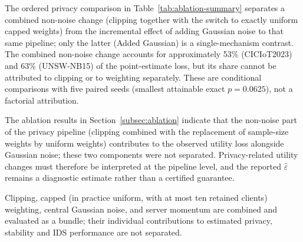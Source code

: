 The ordered privacy comparison in Table~\ref{tab:ablation-summary} separates a combined non-noise change (clipping together with the switch to exactly uniform capped weights) from the incremental effect of adding Gaussian noise to that same pipeline; only the latter (Added Gaussian) is a single-mechanism contrast. The combined non-noise change accounts for approximately 53\% (CICIoT2023) and 63\% (UNSW-NB15) of the point-estimate loss, but its share cannot be attributed to clipping or to weighting separately. These are conditional comparisons with five paired seeds (smallest attainable exact $p=0.0625$), not a factorial attribution.

The ablation results in Section~\ref{subsec:ablation} indicate that the non-noise part of the privacy pipeline (clipping combined with the replacement of sample-size weights by uniform weights) contributes to the observed utility loss alongside Gaussian noise; these two components were not separated. Privacy-related utility changes must therefore be interpreted at the pipeline level, and the reported $\widehat{\varepsilon}$ remains a diagnostic estimate rather than a certified guarantee.

\item Clipping, capped (in practice uniform, with at most ten retained clients) weighting, central Gaussian noise, and server momentum are combined and evaluated as a bundle; their individual contributions to estimated privacy, stability and IDS performance are not separated.


